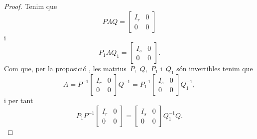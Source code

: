 \documentclass[../../main.tex]{subfiles}
\begin{document}
\begin{theorem}
\begin{proof}
			Tenim que
			\[PAQ=\left[\begin{array}{c|c}
			I_{r} & 0\\\hline
			0 & 0
			\end{array}\right]\]
			i
			\[P_{1}AQ_{1}=\left[\begin{array}{c|c}
			I_{s} & 0\\\hline
			0 & 0
			\end{array}\right].\]
			Com que, per la proposició , les matrius~\(P\),~\(Q\),~\(P_{1}\) i~\(Q_{1}\) són invertibles tenim que
			\[A=P^{-1}\left[\begin{array}{c|c}
			I_{r} & 0\\\hline
			0 & 0
			\end{array}\right]Q^{-1}=P_{1}^{-1}\left[\begin{array}{c|c}
			I_{s} & 0\\\hline
			0 & 0
			\end{array}\right]Q_{1}^{-1},\]
			i per tant
			\[P_{1}P^{-1}\left[\begin{array}{c|c}
			I_{r} & 0\\\hline
			0 & 0
			\end{array}\right]=
			\left[\begin{array}{c|c}
			I_{s} & 0\\\hline
			0 & 0
			\end{array}\right]Q_{1}^{-1}Q.\]


\end{proof}
\end{theorem}
\end{document}
